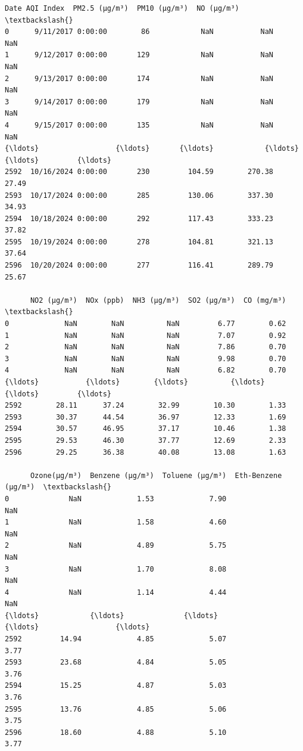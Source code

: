\documentclass[11pt]{article}
\makeatletter
\newcommand{\boxspacing}{\kern\kvtcb@left@rule\kern\kvtcb@boxsep}
\newcommand{\prompt}[4]{
        {\ttfamily\llap{{\color{#2}[#3]:\hspace{3pt}#4}}\vspace{-\baselineskip}}
    }
\makeatother
\begin{document}
            \begin{tcolorbox}[breakable, size=fbox, boxrule=.5pt, pad at break*=1mm, opacityfill=0]
\prompt{Out}{outcolor}{3}{\boxspacing}
\begin{Verbatim}[commandchars=\\\{\}]
                    Date AQI Index  PM2.5 (µg/m³)  PM10 (µg/m³)  NO (µg/m³)  \textbackslash{}
0      9/11/2017 0:00:00        86            NaN           NaN         NaN
1      9/12/2017 0:00:00       129            NaN           NaN         NaN
2      9/13/2017 0:00:00       174            NaN           NaN         NaN
3      9/14/2017 0:00:00       179            NaN           NaN         NaN
4      9/15/2017 0:00:00       135            NaN           NaN         NaN
{\ldots}                  {\ldots}       {\ldots}            {\ldots}           {\ldots}         {\ldots}
2592  10/16/2024 0:00:00       230         104.59        270.38       27.49
2593  10/17/2024 0:00:00       285         130.06        337.30       34.93
2594  10/18/2024 0:00:00       292         117.43        333.23       37.82
2595  10/19/2024 0:00:00       278         104.81        321.13       37.64
2596  10/20/2024 0:00:00       277         116.41        289.79       25.67

      NO2 (µg/m³)  NOx (ppb)  NH3 (µg/m³)  SO2 (µg/m³)  CO (mg/m³)  \textbackslash{}
0             NaN        NaN          NaN         6.77        0.62
1             NaN        NaN          NaN         7.07        0.92
2             NaN        NaN          NaN         7.86        0.70
3             NaN        NaN          NaN         9.98        0.70
4             NaN        NaN          NaN         6.82        0.70
{\ldots}           {\ldots}        {\ldots}          {\ldots}          {\ldots}         {\ldots}
2592        28.11      37.24        32.99        10.30        1.33
2593        30.37      44.54        36.97        12.33        1.69
2594        30.57      46.95        37.17        10.46        1.38
2595        29.53      46.30        37.77        12.69        2.33
2596        29.25      36.38        40.08        13.08        1.63

      Ozone(µg/m³)  Benzene (µg/m³)  Toluene (µg/m³)  Eth-Benzene (µg/m³)  \textbackslash{}
0              NaN             1.53             7.90                  NaN
1              NaN             1.58             4.60                  NaN
2              NaN             4.89             5.75                  NaN
3              NaN             1.70             8.08                  NaN
4              NaN             1.14             4.44                  NaN
{\ldots}            {\ldots}              {\ldots}              {\ldots}                  {\ldots}
2592         14.94             4.85             5.07                 3.77
2593         23.68             4.84             5.05                 3.76
2594         15.25             4.87             5.03                 3.76
2595         13.76             4.85             5.06                 3.75
2596         18.60             4.88             5.10                 3.77


\end{Verbatim}
\end{tcolorbox}
\end{document}
